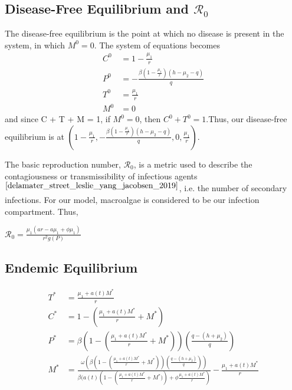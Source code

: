 \documentclass[12pt]{article}
\begin{document}
\subsection{Disease-Free Equilibrium and $\mathscr{R}_{0}$}
The disease-free equilibrium is the point at which no disease is present in the system, in which $M^{0} = 0$. The system of equations becomes
\begin{align*}
        C^{0} &= 1 - \frac{\mu_{1}}{r}\\
        P^{0} &= -\frac{\beta(1 - \frac{\mu_{1}}{r})(h - \mu_{2} - q)}{q}\\
        T^{0} &= \frac{\mu_{1}}{r}\\
        M^{0} &= 0 
\end{align*}
and since C + T + M = 1, if $M^{0} = 0$, then $C^{0} + T^{0} = 1$.Thus, our disease-free equilibrium is at $(1 - \frac{\mu_{1}}{r}, -\frac{\beta(1 - \frac{\mu_{1}}{r})(h - \mu_{2} - q)}{q}, 0, \frac{\mu_{1}}{r})$.

The basic reproduction number, $\mathscr{R}_{0}$, is a metric used to describe the contagiousness or transmissibility of infectious agents $^{\cite{delamater_street_leslie_yang_jacobsen_2019}}$, i.e. the number of secondary infections. For our model, macroalgae is considered to be our infection compartment. Thus, 

\begin{center}

$\displaystyle {\mathscr{R}}_{0} = \frac{\mu_{1}(a r - a\mu_{1} + \phi \mu_{1})}{r^{2}g(P)}$

\end{center}

\subsection{Endemic Equilibrium}
\begin{align*}
        T^{*} &= \frac{\mu_{1} + a(t)M^{*}}{r} \\
        C^{*} %
        &= 1- \left(\frac{\mu_{1} + a(t)M^{*}}{r} + M^{*} \right)\\
        P^{*} %
        &= \beta \left(1- \left(\frac{\mu_{1} + a(t)M^{*}}{r} + M^{*} \right) \right) \left(\frac{q-(h+\mu_{2})}{q} \right)\\
        M^{*} &= \frac{\omega (\beta \left(1- \left(\frac{\mu_{1} + a(t)M^{*}}{r} + M^{*} \right) \right) \left(\frac{q-(h+\mu_{2})}{q} \right))}{\beta(a(t)(1- \left(\frac{\mu_{1} + a(t)M^{*}}{r} + M^{*}) \right)+\phi \frac{\mu_{1} + a(t)M^{*}}{r})} - \frac{\mu_{1} + a(t)M^{*}}{r} \\
\end{align*}
\end{document}
